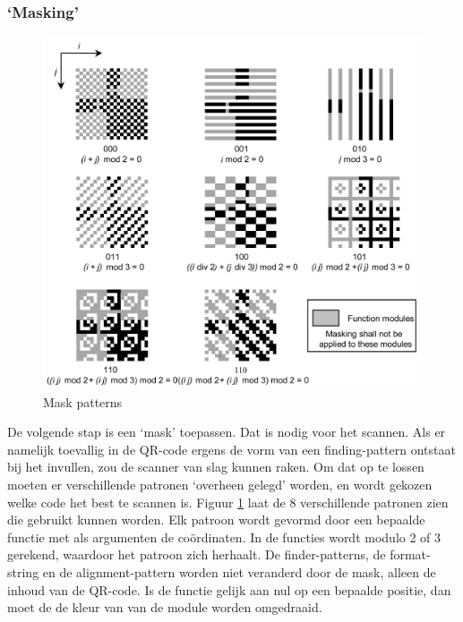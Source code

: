 \documentclass{article}
\begin{document}
\subsubsection{`Masking'}
\begin{figure}[h]
\centering
\includegraphics[width=0.8\linewidth]{mask-patterns.png}
\caption{Mask patterns}
\label{fig:mask-patterns}
\end{figure}
De volgende stap is een `mask' toepassen. Dat is nodig voor het scannen. Als er namelijk toevallig in de QR-code ergens de vorm van een finding-pattern ontstaat bij het invullen, zou de scanner van slag kunnen raken. Om dat op te lossen moeten er verschillende patronen `overheen gelegd' worden, en wordt gekozen welke code het best te scannen is.  Figuur \ref{fig:mask-patterns} laat de 8 verschillende patronen zien die gebruikt kunnen worden. Elk patroon wordt gevormd door een bepaalde functie met als argumenten de coördinaten. In de functies wordt modulo 2 of 3 gerekend, waardoor het patroon zich herhaalt. De finder-patterns, de format-string en de alignment-pattern worden niet veranderd door de mask, alleen de inhoud van de QR-code. Is de functie gelijk aan nul op een bepaalde positie, dan moet de de kleur van van de module worden omgedraaid.
\end{document}
